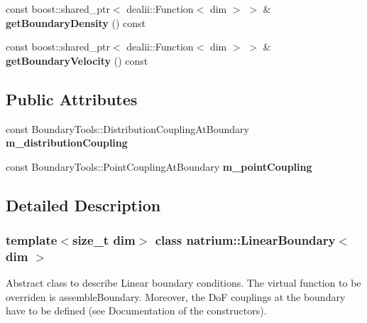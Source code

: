 \begin{DoxyCompactItemize}
\item 
\hypertarget{classnatrium_1_1LinearBoundary_a539369decad08b0b7d926347b8a40760}{
const boost::shared\_\-ptr$<$ dealii::Function$<$ dim $>$ $>$ \& {\bfseries getBoundaryDensity} () const }
\label{classnatrium_1_1LinearBoundary_a539369decad08b0b7d926347b8a40760}

\item 
\hypertarget{classnatrium_1_1LinearBoundary_a639ded592d64c585e5956aeaa29be9aa}{
const boost::shared\_\-ptr$<$ dealii::Function$<$ dim $>$ $>$ \& {\bfseries getBoundaryVelocity} () const }
\label{classnatrium_1_1LinearBoundary_a639ded592d64c585e5956aeaa29be9aa}

\end{DoxyCompactItemize}
\subsection*{Public Attributes}
\begin{DoxyCompactItemize}
\item 
\hypertarget{classnatrium_1_1LinearBoundary_a9b166780351261b373326b5267254ed0}{
const BoundaryTools::DistributionCouplingAtBoundary {\bfseries m\_\-distributionCoupling}}
\label{classnatrium_1_1LinearBoundary_a9b166780351261b373326b5267254ed0}

\item 
\hypertarget{classnatrium_1_1LinearBoundary_a28411a6d35cd5ddbb056fc061635092c}{
const BoundaryTools::PointCouplingAtBoundary {\bfseries m\_\-pointCoupling}}
\label{classnatrium_1_1LinearBoundary_a28411a6d35cd5ddbb056fc061635092c}

\end{DoxyCompactItemize}


\subsection{Detailed Description}
\subsubsection*{template$<$size\_\-t dim$>$ class natrium::LinearBoundary$<$ dim $>$}

Abstract class to describe Linear boundary conditions. The virtual function to be overriden is assembleBoundary. Moreover, the DoF couplings at the boundary have to be defined (see Documentation of the constructors). 

